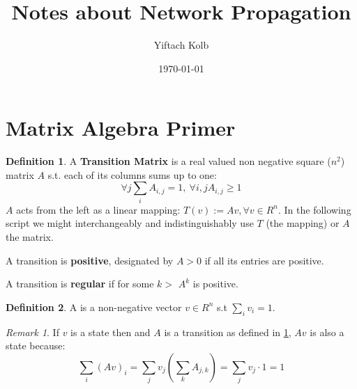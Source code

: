 \documentclass[a4paper,10pt]{article}
\theoremstyle{definition}
\newtheorem{mydef}{Definition}[section]
\theoremstyle{remark}
\newtheorem{remark}{Remark}
\theoremstyle{plain}
\begin{document}
\renewcommand{\thesubsection}{\thesection.\alph{subsection}}\renewcommand{\thesubsection}{\thesection.\alph{subsection}}

\begin{titlepage}
    \title{Notes about Network Propagation}
    \author{Yiftach Kolb}
    \date{\today}
\end{titlepage}

\maketitle

\everymath{\color{blue}}
\everydisplay{\color{blue}} 

\section{Matrix Algebra Primer}

\begin{mydef}
\label{def:transition}
A \textbf{Transition Matrix} is a real valued non negative square ($n^2$) matrix $A$ s.t. each of its
columns sums up to one: $$\forall j \sum_i A_{i,j} = 1,\ \forall i,j A_{i,j} \geq
1$$ 
$A$ acts from the left as a linear mapping:
$T(v) := Av, \forall v \in R^{n}$. In the following script we might
interchangeably and indistinguishably use $T$ (the mapping) or $A$ the matrix.

A transition is \textbf{positive}, designated by $A > 0$ if all its entries are positive.

A transition is \textbf{regular} if for some $k>$ $A^k$ is positive.
\end{mydef}

\begin{mydef}
\label{def:state}
A  is a non-negative vector $v \in R^n$ s.t $\sum_i v_i = 1$.
\end{mydef}

\begin{remark}
\label{remark1}
If $v$ is a
state then and $A$ is a transition as defined in
\ref{def:transition}, 
  $Av$ is also a state because: 
$$\sum_i(Av)_i = \sum_j v_j(\sum_k A_{j,k}) = \sum_j v_j \cdot 1 = 1$$
\end{remark}
\end{document}
